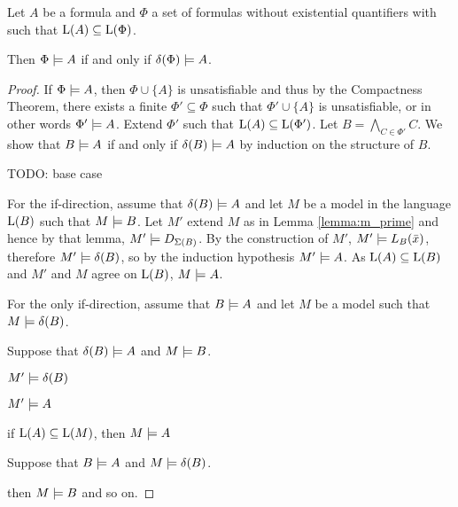 \begin{lemma}
	Let $A$ be a formula and $\Phi$ a set of formulas without existential quantifiers with such that $\operatorname{L}(A) \subseteq \operatorname{L}(\Phi)$.

	Then $\Phi \models A$ if and only if $\delta(\Phi) \models A$.

\end{lemma}
\begin{proof}
	If $\Phi \models A$, then $\Phi \cup \{A\}$ is unsatisfiable and thus by the Compactness Theorem,
	there exists a finite $\Phi' \subseteq \Phi$ such that $\Phi' \cup \{A\}$ is unsatisfiable, or in other words $\Phi' \models A$.
	Extend $\Phi'$ such that $\operatorname{L}(A) \subseteq \operatorname{L}(\Phi')$.
	Let $B = \bigwedge_{C\in \Phi'} C$.
	We show that $B \models A$ if and only if $\delta(B) \models A$ by induction on the structure of $B$.


	TODO: base case

	For the if-direction, assume that $\delta(B) \models A$ and let $M$ be a model in the language $\operatorname{L}(B)$ such that $M \models B$.
	Let $M'$ extend $M$ as in Lemma \ref{lemma:m_prime} and hence by that lemma, $M' \models D_{\Sigma(B)}$.
	By the construction of $M'$, $M' \models L_B(\bar x)$, therefore $M' \models \delta(B)$, so by the induction hypothesis $M' \models A$. 
	As $\operatorname{L}(A) \subseteq \operatorname{L}(B)$ and $M'$ and $M$ agree on $\operatorname{L}(B)$, $M \models A$.

	For the only if-direction, assume that $B \models A$ and let $M$ be a model such that $M\models \delta(B)$.  



	\clearpage
	Suppose that $\delta(B) \models A$ and $M \models B$.

	$M' \models \delta(B)$

	$M' \models A$

	if $\operatorname{L}(A) \subseteq \operatorname{L}(M)$, then $M\models A$
	\bigskip

	Suppose that $B \models A$ and $M \models \delta(B)$.

	then $M \models B$ and so on.


\end{proof}

